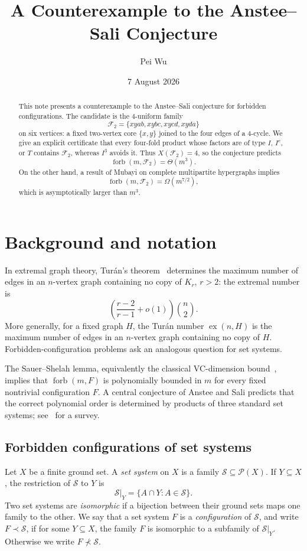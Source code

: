 \documentclass[11pt]{article}
\title{A Counterexample to the Anstee--Sali Conjecture}
\author{Pei Wu}
\date{7 August 2026}
\theoremstyle{definition}
\newcommand{\forb}{\operatorname{forb}}
\newcommand{\ex}{\operatorname{ex}}
\newcommand{\cF}{\mathcal F}
\begin{document}
	\maketitle
	
	\begin{abstract}
		This note presents a counterexample to the Anstee--Sali conjecture for forbidden
		configurations. The candidate is the $4$-uniform family
		\[
		\cF_2=\{xyab,xybc,xycd,xyda\}
		\]
		on six vertices: a fixed two-vertex core $\{x,y\}$ joined to the four edges of a
		$4$-cycle. We give an explicit certificate that every four-fold product whose
		factors are of type $I$, $I^c$, or $T$ contains $\cF_2$, whereas $I^3$ avoids it.
		Thus $X(\cF_2)=4$, so the conjecture predicts
		\[
		\forb(m,\cF_2)=\Theta(m^3).
		\]
		On the other hand, a result of Mubayi on complete multipartite hypergraphs
		implies
		\[
		\forb(m,\cF_2)=\Omega(m^{7/2}),
		\]
		which is asymptotically larger than $m^3$.
	\end{abstract}
	
	\section{Background and notation}
	
	In extremal graph theory, Tur\'an's theorem~\cite{Turan1941} determines the
	maximum number of edges in an $n$-vertex graph containing no copy of $K_r$,
	$r>2$: the extremal number is
	\[
	\left(\frac{r-2}{r-1}+o(1)\right)\binom{n}{2}.
	\]
	More generally, for a fixed graph $H$, the Tur\'an number $\ex(n,H)$ is the
	maximum number of edges in an $n$-vertex graph containing no copy of $H$.
	Forbidden-configuration problems ask an analogous question for set systems.
	
	The Sauer--Shelah lemma, equivalently the classical VC-dimension
	bound~\cite{Sauer1972,Shelah1972,VapnikChervonenkis1971}, implies that
	$\forb(m,F)$ is polynomially bounded in $m$ for every fixed nontrivial
	configuration $F$. A central conjecture of Anstee and Sali predicts that the
	correct polynomial order is determined by products of three standard set
	systems; see~\cite{AnsteeSali2013} for a survey.
	
	\subsection{Forbidden configurations of set systems}
	
	Let $X$ be a finite ground set. A \emph{set system} on $X$ is a family
	$\mathcal S\subseteq \mathcal P(X)$. If $Y\subseteq X$, the restriction of
	$\mathcal S$ to $Y$ is
	\[
	\mathcal S|_Y=\{A\cap Y:A\in\mathcal S\}.
	\]
	Two set systems are \emph{isomorphic} if a bijection between their ground sets
	maps one family to the other. We say that a set system $F$ is a
	\emph{configuration} of $\mathcal S$, and write $F\prec\mathcal S$, if for
	some $Y\subseteq X$, the family $F$ is isomorphic to a subfamily of
	$\mathcal S|_Y$. Otherwise we write $F\not\prec\mathcal S$.
	
\end{document}
